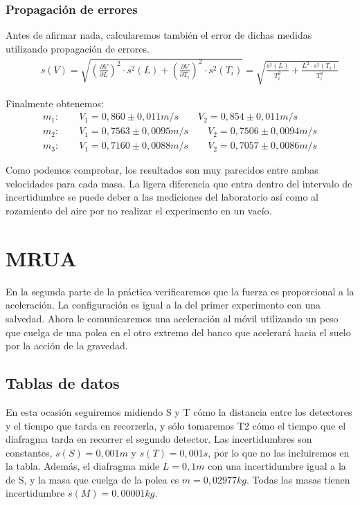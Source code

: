 \documentclass[12pt, a4paper, titlepage]{article}
\begin{document}
  \subsubsection{Propagación de errores}

  Antes de afirmar nada, calcularemos también el error de dichas medidas utilizando propagación de errores.
  \begin{gather}
    \qquad s(V) = \sqrt{\left(\frac{\partial V}{\partial L}\right)^2 \cdot s^2(L) + \left(\frac{\partial V}{\partial T_i}\right)^2 \cdot s^2(T_i)} = \sqrt{\frac{s^2(L)}{T_i^2} + \frac{L^2 \cdot s^2(T_i)}{T_i^4}}
    \label{ec:sv}
  \end{gather}

  Finalmente obtenemos:
  \begin{gather*}
    m_1: \qquad V_1 = 0,860 \pm 0,011 m/s \qquad V_2 = 0,854 \pm 0,011 m/s \\
    m_2: \qquad V_1 = 0,7563 \pm 0,0095 m/s \qquad V_2 = 0,7506 \pm 0,0094 m/s\\
    m_3: \qquad V_1 = 0,7160 \pm 0,0088 m/s \qquad V_2 = 0,7057 \pm 0,0086 m/s
  \end{gather*}

  Como podemos comprobar, los resultados son muy parecidos entre ambas velocidades para cada masa. La ligera diferencia que entra dentro del intervalo de incertidumbre se puede deber a las mediciones del laboratorio así como al rozamiento del aire por no realizar el experimento en un vacío.


  \newpage
  \section{MRUA}

  En la segunda parte de la práctica verificaremos que la fuerza es proporcional a la aceleración. La configuración es igual a la del primer experimento con una salvedad. Ahora le comunicaremos una aceleración al móvil utilizando un peso que cuelga de una polea en el otro extremo del banco que acelerará hacia el suelo por la acción de la gravedad.

  \subsection{Tablas de datos}

  En esta ocasión seguiremos midiendo S y T cómo la distancia entre los detectores y el tiempo que tarda en recorrerla, y sólo tomaremos T2 cómo el tiempo que el diafragma tarda en recorrer el segundo detector. Las incertidumbres son constantes, $s(S) = 0,001m$ y $s(T) = 0,001s$, por lo que no las incluiremos en la tabla. Además, el diafragma mide $L = 0,1m$ con una incertidumbre igual a la de S, y la masa que cuelga de la polea es $m = 0,02977 kg$. Todas las masas tienen incertidumbre $s(M) = 0,00001 kg$.
\end{document}
